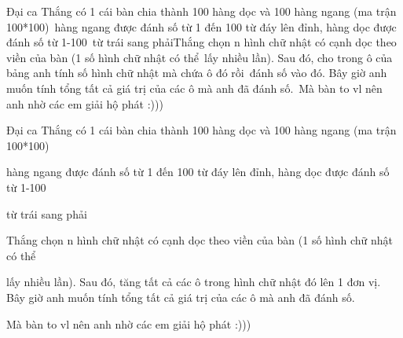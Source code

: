 Đại ca Thắng có 1 cái bàn chia thành 100 hàng dọc và 100 hàng ngang (ma trận 100*100) hàng ngang được đánh số từ 1 đến 100 từ đáy lên đỉnh, hàng dọc được đánh số từ 1-100 từ trái sang phảiThắng chọn n hình chữ nhật có cạnh dọc theo viền của bàn (1 số hình chữ nhật có thể lấy nhiều lần). Sau đó, cho trong ô của bảng anh tính số hình chữ nhật mà chứa ô đó rồi đánh số vào đó. Bây giờ anh muốn tính tổng tất cả giá trị của các ô mà anh đã đánh số. Mà bàn to vl nên anh nhờ các em giải hộ phát :)))

Đại ca Thắng có 1 cái bàn chia thành 100 hàng dọc và 100 hàng ngang (ma trận 100*100) 

hàng ngang được đánh số từ 1 đến 100 từ đáy lên đỉnh, hàng dọc được đánh số từ 1-100 

từ trái sang phải

Thắng chọn n hình chữ nhật có cạnh dọc theo viền của bàn (1 số hình chữ nhật có thể 

lấy nhiều lần). Sau đó, tăng tất cả các ô trong hình chữ nhật đó lên 1 đơn vị. Bây giờ anh muốn tính tổng tất cả giá trị của các ô mà anh đã đánh số. 

Mà bàn to vl nên anh nhờ các em giải hộ phát :)))